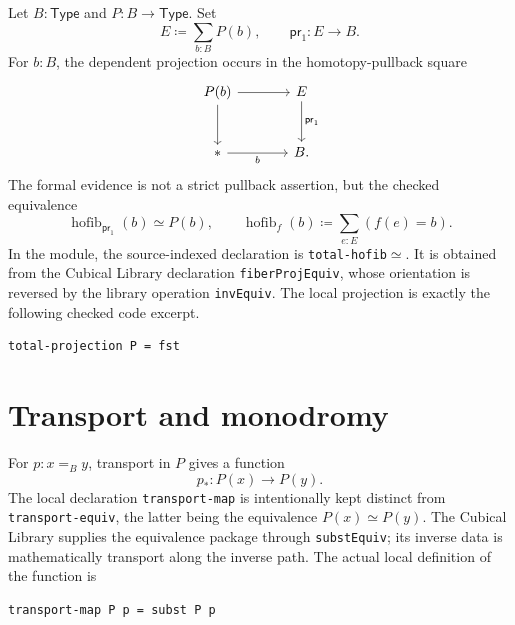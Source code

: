 \documentclass[11pt,reqno]{amsart}
\theoremstyle{mytheorem}
\theoremstyle{mydefinition}
\DeclareMathOperator{\hofib}{hofib}
\newcommand{\Type}{\mathsf{Type}}
\newcommand{\ag}[1]{\texttt{#1}}
\begin{document}
Let $B:\Type$ and $P:B\to\Type$.  Set
\begin{equation}\label{eq:total}
 E\coloneqq\sum_{b:B}P(b),\qquad \mathsf{pr}_1:E\to B.
\end{equation}
For $b:B$, the dependent projection occurs in the homotopy-pullback square
\[
\begin{tikzcd}[column sep=large,row sep=large]
 P(b) \arrow[r] \arrow[d] & E \arrow[d,"\mathsf{pr}_1"]\\
 {*} \arrow[r,"b"'] & B.
\end{tikzcd}
\]
The formal evidence is not a strict pullback assertion, but the checked
equivalence
\begin{equation}\label{eq:fiber}
 \hofib_{\mathsf{pr}_1}(b)\simeq P(b),
 \qquad \hofib_f(b)\coloneqq\sum_{e:E}(f(e)=b).
\end{equation}
In the module, the source-indexed declaration is
\ag{total-hofib}\ensuremath{\simeq}.  It is
obtained from the Cubical Library declaration \ag{fiberProjEquiv}, whose
orientation is reversed by the library operation \ag{invEquiv}.  The local
projection is exactly the following checked code excerpt.
\begin{lstlisting}
total-projection P = fst
\end{lstlisting}

\section{Transport and monodromy}

For $p:x=_B y$, transport in $P$ gives a function
\begin{equation}\label{eq:transport-function}
 p_*:P(x)\longrightarrow P(y).
\end{equation}
The local declaration \ag{transport-map} is intentionally kept distinct from
\ag{transport-equiv}, the latter being the equivalence $P(x)\simeq P(y)$.
The Cubical Library supplies the equivalence package through \ag{substEquiv};
its inverse data is mathematically transport along the inverse path.  The
actual local definition of the function is
\begin{lstlisting}
transport-map P p = subst P p
\end{lstlisting}
\end{document}
